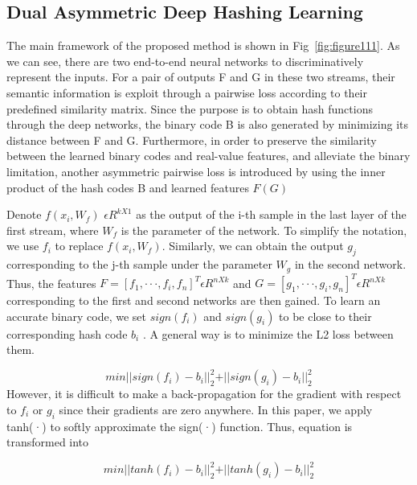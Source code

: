 \documentclass[12pt, a4paper,twoside]{article}
\begin{document}
\subsection{Dual Asymmetric Deep Hashing Learning}
	The main framework of the proposed method is shown in Fig~\ref{fig:figure111}. As we can see, there are two end-to-end neural networks to discriminatively represent the inputs. For a pair of outputs F and G in these two streams, their semantic
information is exploit through a pairwise loss according to their predefined similarity matrix. Since the purpose is to
obtain hash functions through the deep networks, the binary code B is also generated by minimizing its distance between
F and G. Furthermore, in order to preserve the similarity between the learned binary codes and real-value features, and
alleviate the binary limitation, another asymmetric pairwise loss is introduced by using the inner product of the hash codes
B and learned features $F (G)$

Denote $f (x_{i}, W_{f} )$ $\epsilon R^{kX1}$ as the output of the i-th sample in the last layer of the first stream, where $W_{f}$ is the parameter of the network. To simplify the notation, we use $f_{i}$ to replace $f (x_{i}, W_{f} )$. Similarly, we can obtain the output $g_{j}$corresponding to the j-th sample under the parameter $W_{g}$ in the second network. Thus, the features $F = [f_{1} , · · · , f_{i} , f_{n} ]^T \epsilon R^{nXk}$ and $G = [g_{1}, · · · , g_{i} , g_{n}]^T \epsilon R^{nXk}$ corresponding to the first and second networks are then gained.
To learn an accurate binary code, we set $sign(f_{i})$ and $sign(g_{i})$ to be close to their corresponding hash code $b_{i}$ . A
general way is to minimize the L2 loss between them.

\begin{equation}
	    min \vert \vert sign(f_{i}) - b_{i} \vert \vert ^2 _{2} + \vert \vert sign(g_{i}) - b_{i} \vert \vert^2_{2}
\label{eq9}
\end{equation}
However, it is difficult to make a back-propagation for the gradient with respect to $f_{i}$ or $g_{i}$ since their gradients are zero anywhere. In this paper, we apply tanh(·) to softly approximate the sign(·) function. Thus, equation is transformed into

\begin{equation}
	    min \vert \vert tanh(f_{i}) - b_{i} \vert \vert ^2 _{2} + \vert \vert tanh(g_{i}) - b_{i} \vert \vert^2_{2}
\label{eq10}
\end{equation}
\end{document}
